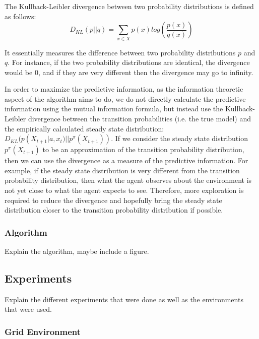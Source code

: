 \documentclass{acm_proc_article-sp}
\begin{document}
The Kullback-Leibler divergence between two probability distributions is defined as follows: 
\[D_{KL}(p || q) = \sum_{x \in X} p(x)log(\frac{p(x)}{q(x)})\]

It essentially measures the difference between two probability distributions $p$ and $q$. For instance, if the two probability distributions are identical, the divergence would be 0, and if they are very different then the divergence may go to infinity.

In order to maximize the predictive information, as the information theoretic aspect of the algorithm aims to do, we do not directly calculate the predictive information using the mutual information formula, but instead use the Kullback-Leibler divergence between the transition probabilities (i.e. the true model) and the empirically calculated steady state distribution: $D_{KL}(p(X_{t+1}|a, x_t) || p^\pi(X_{t+1}))$. If we consider the steady state distribution $p^\pi(X_{t+1})$ to be an approximation of the transition probability distribution, then we can use the divergence as a measure of the predictive information. For example, if the steady state distribution is very different from the transition probability distribution, then what the agent observes about the environment is not yet close to what the agent expects to see. Therefore, more exploration is required to reduce the divergence and hopefully bring the steady state distribution closer to the transition probability distribution if possible. 

\subsubsection{Algorithm} %

Explain the algorithm, maybe include a figure.

\subsection{Experiments}

Explain the different experiments that were done as well as the environments that were used.

\subsubsection{Grid Environment}

\end{document}
